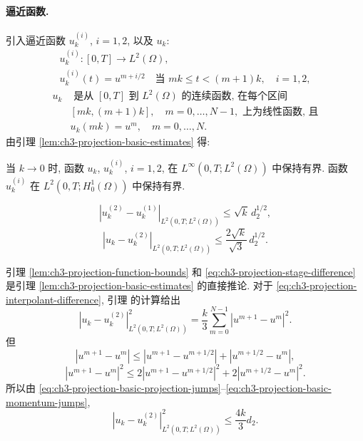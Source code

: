 \paragraph{逼近函数.}
引入逼近函数 $u_k^{(i)}$, $i=1,2$, 以及 $u_k$:
\begin{equation}
\begin{gathered}
u_k^{(i)}:[0,T]\longrightarrow L^2(\Omega),\\
u_k^{(i)}(t)=u^{m+i/2}\quad\text{当 }mk\leq t<(m+1)k,\quad i=1,2,
\end{gathered}
\label{eq:ch3-projection-piecewise-constant}
\end{equation}
\begin{equation}
\begin{aligned}
u_k&\text{ 是从 }[0,T]\text{ 到 }L^2(\Omega)\text{ 的连续函数, 在每个区间}\\
&[mk,(m+1)k],\quad m=0,\ldots,N-1,\text{ 上为线性函数, 且}\\
&u_k(mk)=u^m,\quad m=0,\ldots,N.
\end{aligned}
\label{eq:ch3-projection-piecewise-linear}
\end{equation}
由引理 \ref{lem:ch3-projection-basic-estimates} 得:

\begin{Lemma}
\label{lem:ch3-projection-function-bounds}
当 $k\to0$ 时, 函数 $u_k$, $u_k^{(i)}$, $i=1,2$, 在 $L^\infty(0,T;L^2(\Omega))$ 中保持有界. 函数 $u_k^{(i)}$ 在 $L^2(0,T;H_0^1(\Omega))$ 中保持有界.
\end{Lemma}

\begin{Lemma}
\label{lem:ch3-projection-function-differences}
\begin{equation}
|u_k^{(2)}-u_k^{(1)}|_{L^2(0,T;L^2(\Omega))}
\leq\sqrt{k}\,d_2^{1/2},
\label{eq:ch3-projection-stage-difference}
\end{equation}
\begin{equation}
|u_k-u_k^{(2)}|_{L^2(0,T;L^2(\Omega))}
\leq\frac{2\sqrt{k}}{\sqrt3}\,d_2^{1/2}.
\label{eq:ch3-projection-interpolant-difference}
\end{equation}
\end{Lemma}

\begin{Proof}
引理 \ref{lem:ch3-projection-function-bounds} 和 \eqref{eq:ch3-projection-stage-difference} 是引理 \ref{lem:ch3-projection-basic-estimates} 的直接推论. 对于 \eqref{eq:ch3-projection-interpolant-difference}, 引理  的计算给出
\[
|u_k-u_k^{(2)}|_{L^2(0,T;L^2(\Omega))}^2
=\frac{k}{3}\sum_{m=0}^{N-1}|u^{m+1}-u^m|^2.
\]
但
\[
|u^{m+1}-u^m|
\leq|u^{m+1}-u^{m+1/2}|+|u^{m+1/2}-u^m|,
\]
\[
|u^{m+1}-u^m|^2
\leq2|u^{m+1}-u^{m+1/2}|^2
+2|u^{m+1/2}-u^m|^2.
\]
所以由 \eqref{eq:ch3-projection-basic-projection-jumps}--\eqref{eq:ch3-projection-basic-momentum-jumps},
\[
|u_k-u_k^{(2)}|_{L^2(0,T;L^2(\Omega))}^2
\leq\frac{4k}{3}d_2.
\]
\end{Proof}

